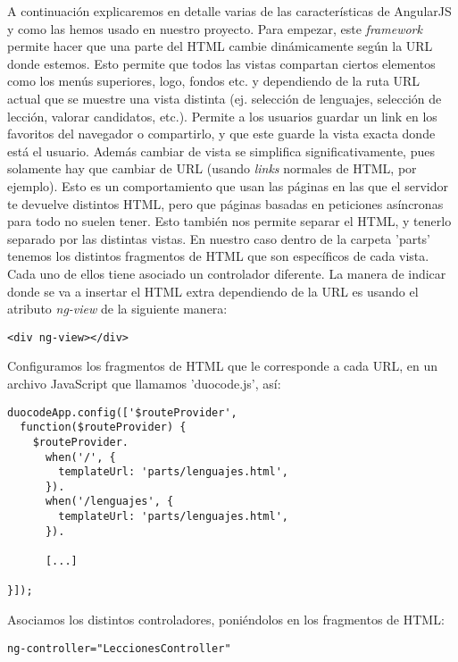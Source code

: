 \vspace{1em}
A continuación explicaremos en detalle varias de las características de AngularJS y como las hemos usado en nuestro proyecto. Para empezar, este \emph{framework} permite hacer que una parte del HTML cambie dinámicamente según la URL donde estemos. Esto permite que todos las vistas compartan ciertos elementos como los menús superiores, logo, fondos etc. y dependiendo de la ruta URL actual que se muestre una vista distinta (ej. selección de lenguajes, selección de lección, valorar candidatos, etc.). Permite a los usuarios guardar un link en los favoritos del navegador o compartirlo, y que este guarde la vista exacta donde está el usuario. Además cambiar de vista se simplifica significativamente, pues solamente hay que cambiar de URL (usando \emph{links} normales de HTML, por ejemplo). Esto es un comportamiento que usan las páginas en las que el servidor te devuelve distintos HTML, pero que páginas basadas en peticiones asíncronas para todo no suelen tener. Esto también nos permite separar el HTML, y tenerlo separado por las distintas vistas. En nuestro caso dentro de la carpeta 'parts' tenemos los distintos fragmentos de HTML que son específicos de cada vista. Cada uno de ellos tiene asociado un controlador diferente. La manera de indicar donde se va a insertar el HTML extra dependiendo de la URL es usando el atributo \emph{ng-view} de la siguiente manera:

{\codesize
\begin{verbatim}
<div ng-view></div>
\end{verbatim}
}

Configuramos los fragmentos de HTML que le corresponde a cada URL, en un archivo JavaScript que llamamos 'duocode.js', así:

\vspace{1em}
{\codesize
\lstset{}
\begin{lstlisting}[frame=single]
duocodeApp.config(['$routeProvider',
  function($routeProvider) {
    $routeProvider.
      when('/', {
        templateUrl: 'parts/lenguajes.html',
      }).
      when('/lenguajes', {
        templateUrl: 'parts/lenguajes.html',
      }).
      
      [...] 
      
}]);
\end{lstlisting}
}
\vspace{1em}

Asociamos los distintos controladores, poniéndolos en los fragmentos de HTML:

{\codesize
\begin{verbatim}
ng-controller="LeccionesController"
\end{verbatim}
}

